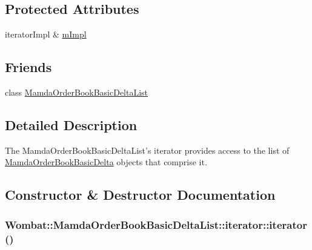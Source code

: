 \subsection*{Protected Attributes}
\begin{CompactItemize}
\item 
iterator\-Impl \& \hyperlink{classWombat_1_1MamdaOrderBookBasicDeltaList_1_1iterator_ec4987702ce908e50f7596133cb0b080}{m\-Impl}
\end{CompactItemize}
\subsection*{Friends}
\begin{CompactItemize}
\item 
class \hyperlink{classWombat_1_1MamdaOrderBookBasicDeltaList_1_1iterator_5d3ae4bc128727ad59f67689abca3b92}{Mamda\-Order\-Book\-Basic\-Delta\-List}
\end{CompactItemize}


\subsection{Detailed Description}
The Mamda\-Order\-Book\-Basic\-Delta\-List's iterator provides access to the list of \hyperlink{classWombat_1_1MamdaOrderBookBasicDelta}{Mamda\-Order\-Book\-Basic\-Delta} objects that comprise it. 



\subsection{Constructor \& Destructor Documentation}
\hypertarget{classWombat_1_1MamdaOrderBookBasicDeltaList_1_1iterator_2b2b16d57802c922600386fa686529ec}{
\subsubsection[iterator]{\setlength{\rightskip}{0pt plus 5cm}Wombat::Mamda\-Order\-Book\-Basic\-Delta\-List::iterator::iterator ()}}
\label{classWombat_1_1MamdaOrderBookBasicDeltaList_1_1iterator_2b2b16d57802c922600386fa686529ec}


